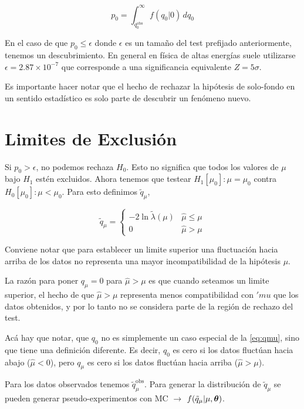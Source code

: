 \begin{equation}
  p_0 = \int_{q_{0}^\text{obs}}^{\infty} f(q_0|0) \, dq_0
  \label{eq:p0}
\end{equation}

En el caso de que $p_0 \leq \epsilon$ donde $\epsilon$ es un tamaño del test
prefijado anteriormente, tenemos un descubrimiento. En general en física
de altas energías suele utilizarse $\epsilon = 2.87 \times 10^{-7}$ que corresponde
a una significancia equivalente $Z=5\sigma$.

Es importante hacer notar que el hecho de rechazar la hipótesis de solo-fondo en
un sentido estadístico es solo parte de descubrir un fenómeno nuevo.


\section{Limites de Exclusión}

Si $p_0> \epsilon$, no podemos rechaza $H_0$. Esto no significa que todos los valores de
$\mu$ bajo $H_1$ estén excluidos. Ahora tenemos que testear $H_1[\mu_0]: \mu = \mu_0$ contra
$H_0[\mu_0]: \mu < \mu_0$. Para esto definimos $\tilde{q}_\mu$,

\begin{equation}
  \tilde{q}_\mu =
  \begin{cases}
    -2 \ln \tilde{\lambda}(\mu) & \hat{\mu} \leq \mu \\
    0 & \hat{\mu} > \mu
  \end{cases} \label{eq:qmu}
\end{equation}

Conviene notar que para establecer un limite superior una fluctuación hacia arriba
de los datos no representa una mayor incompatibilidad de la hipótesis $\mu$.

La razón para poner $q_\mu = 0$ para $\hat{\mu} > \mu$ es que cuando seteamos un limite
superior, el hecho de que $\hat{\mu} > \mu$ representa menos compatibilidad con $'mu$ que
los datos obtenidos, y por lo tanto no se considera parte de la región de rechazo del test.

Acá hay que notar, que $q_0$ no es simplemente un caso especial de la {\eq} \eqref{eq:qmu},
sino que tiene una definición diferente. Es decir, $q_0$ es cero si los datos fluctúan
hacia abajo ($\hat{\mu}<0$), pero $q_\mu$ es cero si los datos fluctúan hacia arriba ($\hat{\mu}>\mu$).

Para los datos observados tenemos $\tilde{q}_\mu^\text{obs}$. Para generar la distribución de $\tilde{q}_\mu$
se pueden generar pseudo-experimentos con MC $\to$ $f(\tilde{q}_\mu|\mu, \bm{\theta})$.

